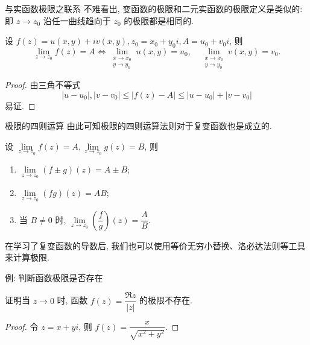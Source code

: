 \begin{frame}{与实函数极限之联系}
	\onslide<+->
	不难看出, 变函数的极限和二元实函数的极限定义是类似的:
	\onslide<+->
	即 $z\to z_0$ 沿任一曲线趋向于 $z_0$ 的极限都是相同的.

	\onslide<+->
	\begin{theorem}
		设 $f(z)=u(x,y)+iv(x,y),z_0=x_0+y_0i,A=u_0+v_0i$, 则
		\[\lim_{z\to z_0}f(z)=A\iff
		\lim_{\substack{x\to x_0\\y\to y_0}}u(x,y)=u_0,\quad
		\lim_{\substack{x\to x_0\\y\to y_0}}v(x,y)=v_0.\]
	\end{theorem}

	\onslide<+->
	\begin{proof}
		由三角不等式
		\[|u-u_0|,|v-v_0|\le|f(z)-A|\le|u-u_0|+|v-v_0|\]
		易证.
	\end{proof}
\end{frame}


\begin{frame}{极限的四则运算}
	\onslide<+->
	由此可知极限的四则运算法则对于复变函数也是成立的.

	\onslide<+->
	\begin{theorem}
		设 $\lim\limits_{z\to z_0}f(z)=A,\lim\limits_{z\to z_0}g(z)=B$, 则
		\begin{enumerate}
			\item $\lim\limits_{z\to z_0}(f\pm g)(z)=A\pm B$;
			\item $\lim\limits_{z\to z_0}(fg)(z)=AB$;
			\item 当 $B\neq 0$ 时, $\lim\limits_{z\to z_0}\left(\dfrac fg\right)(z)=\dfrac AB$.
		\end{enumerate}
	\end{theorem}

	\onslide<+->
	在学习了复变函数的导数后, 我们也可以使用等价无穷小替换、洛必达法则等工具来计算极限.
\end{frame}


\begin{frame}{例: 判断函数极限是否存在}
	\onslide<+->
	\begin{example}
		证明当 $z\to0$ 时, 函数 $f(z)=\dfrac{\Re z}{|z|}$ 的极限不存在.
	\end{example}

	\onslide<+->
	\begin{proof}
		令 $z=x+yi$, 则 $f(z)=\dfrac x{\sqrt{x^2+y^2}}$.
		\onslide<+->{因此
			\[u(x,y)=\frac x{\sqrt{x^2+y^2}},\quad v(x,y)=0.\]}

	\end{proof}
\end{frame}


